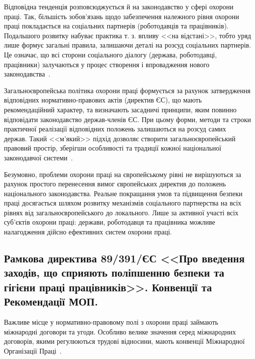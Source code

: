 Відповідна тенденція розповсюджується й на законодавство у сфері охорони праці. 
Так, більшість зобов’язань щодо забезпечення належного рівня охорони праці покладається на соціальних партнерів (роботодавців та працівників).
Подальшого розвитку набуває практика т. з. впливу <<на відстані>>, тобто уряд лише формує загальні правила, залишаючи деталі на розсуд соціальних партнерів. 
Це означає, що всі сторони соціального діалогу (держава, роботодавці, працівники) залучаються у процес створення і впровадження нового законодавства~\cite{Shashula2015}. 

Загальноєвропейська політика охорони праці формується за рахунок затвердження відповідних нормативно-правових актів (директив ЄС), що мають рекомендаційний характер, та визначають засадничі принципи, яким повинно відповідати законодавство держав-членів ЄС. 
При цьому форми, методи та строки практичної реалізації відповідних положень залишаються на розсуд самих держав.
Такий <<м’який>> підхід дозволяє створити загальноєвропейський правовий простір, зберігши особливості та традиції кожної національної законодавчої системи~\cite{Shashula2015}.

Безумовно, проблеми охорони праці на європейському рівні не вирішуються за рахунок простого перенесення вимог європейських директив до положень національного законодавства. 
Реальне покращання умов та підвищення безпеки праці досягається шляхом розвитку механізмів соціального партнерства на всіх рівнях від загальноєвропейського до локального. 
Лише за активної участі всіх суб’єктів охорони праці: держави, роботодавця та працівника можливе налагодження дійсно ефективних систем охорони праці. 

\subsection{Рамкова директива 89/391/ЄС <<Про введення заходів, що сприяють поліпшенню безпеки та гігієни праці працівників>>. Конвенції та Рекомендації МОП.}
Важливе місце у нормативно-правовому полі з охорони праці займають міжнародні договори та угоди.
Особливо велике значення серед міжнародних договорів, якими регулюються трудові відносини, мають конвенції Міжнародної Організації Праці~\cite{LectureKPI}.

